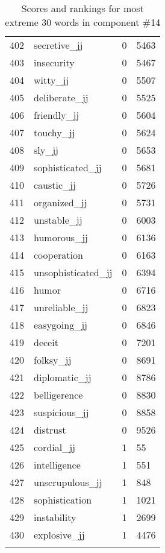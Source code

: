 \begin{longtable}[!htbp]{| rlr@{.}l |}
    402 & secretive\_jj & 0 & 5463 \\
    403 & insecurity & 0 & 5467 \\
    404 & witty\_jj & 0 & 5507 \\
    405 & deliberate\_jj & 0 & 5525 \\
    406 & friendly\_jj & 0 & 5604 \\
    407 & touchy\_jj & 0 & 5624 \\
    408 & sly\_jj & 0 & 5653 \\
    409 & sophisticated\_jj & 0 & 5681 \\
    410 & caustic\_jj & 0 & 5726 \\
    411 & organized\_jj & 0 & 5731 \\
    412 & unstable\_jj & 0 & 6003 \\
    413 & humorous\_jj & 0 & 6136 \\
    414 & cooperation & 0 & 6163 \\
    415 & unsophisticated\_jj & 0 & 6394 \\
    416 & humor & 0 & 6716 \\
    417 & unreliable\_jj & 0 & 6823 \\
    418 & easygoing\_jj & 0 & 6846 \\
    419 & deceit & 0 & 7201 \\
    420 & folksy\_jj & 0 & 8691 \\
    421 & diplomatic\_jj & 0 & 8786 \\
    422 & belligerence & 0 & 8830 \\
    423 & suspicious\_jj & 0 & 8858 \\
    424 & distrust & 0 & 9526 \\
    425 & cordial\_jj & 1 & 55 \\
    426 & intelligence & 1 & 551 \\
    427 & unscrupulous\_jj & 1 & 848 \\
    428 & sophistication & 1 & 1021 \\
    429 & instability & 1 & 2699 \\
    430 & explosive\_jj & 1 & 4476 \\
    \hline
    \caption{Scores and rankings for most extreme 30 words in component \#14} \\
\end{longtable}

